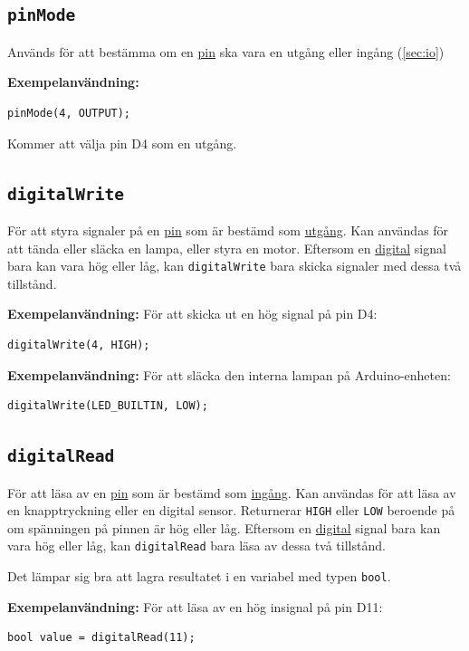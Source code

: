 \documentclass[11pt]{article}
\begin{document}
\subsection{\texttt{pinMode}}\label{sec:pinmode}
Används för att bestämma om en \hyperref[sec:pin]{pin} ska vara en utgång eller
ingång (\ref{sec:io})

\textbf{Exempelanvändning:}
\begin{lstlisting}
pinMode(4, OUTPUT);
\end{lstlisting}
Kommer att välja pin D4 som en utgång.

\subsection{\texttt{digitalWrite}}
För att styra signaler på en \hyperref[sec:pin]{pin} som är bestämd som
\hyperref[sec:io]{utgång}. Kan användas för att tända eller släcka en lampa,
eller styra en motor. Eftersom en \hyperref[sec:analog-digital]{digital} signal
bara kan vara hög eller låg, kan \texttt{digitalWrite} bara skicka signaler med
dessa två tillstånd.

\textbf{Exempelanvändning:}
För att skicka ut en hög signal på pin D4:
\begin{lstlisting}
digitalWrite(4, HIGH);
\end{lstlisting}

\textbf{Exempelanvändning:}
För att släcka den interna lampan på Arduino-enheten:
\begin{lstlisting}
digitalWrite(LED_BUILTIN, LOW);
\end{lstlisting}

\subsection{\texttt{digitalRead}}
För att läsa av en \hyperref[sec:pin]{pin} som är bestämd som
\hyperref[sec:io]{ingång}. Kan användas för att läsa av en knapptryckning eller
en digital sensor. Returnerar \texttt{HIGH} eller \texttt{LOW} beroende på om
spänningen på pinnen är hög eller låg. Eftersom en
\hyperref[sec:analog-digital]{digital} signal bara kan vara hög eller låg, kan
\texttt{digitalRead} bara läsa av dessa två tillstånd.

Det lämpar sig bra att lagra resultatet i en variabel med typen \texttt{bool}.

\textbf{Exempelanvändning:}
För att läsa av en hög insignal på pin D11:
\begin{lstlisting}
bool value = digitalRead(11);
\end{lstlisting}
\end{document}
